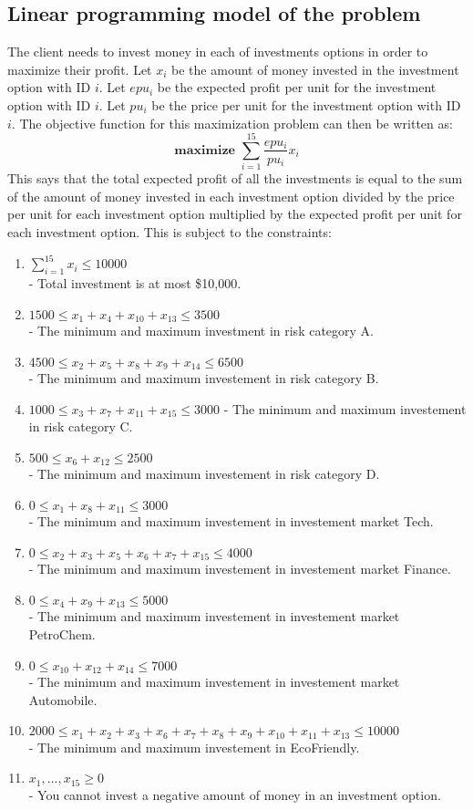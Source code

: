 \documentclass[12pt]{article}
\begin{document}
\subsection*{Linear programming model of the problem}
The client needs to invest money in each of investments options in order to maximize their profit.  Let $x_{i}$ be the amount of money invested in the investment option with ID $i$.  Let $epu_{i}$ be the expected profit per unit for the investment option with ID $i$.  Let $pu_{i}$ be the price per unit for the investment option with ID $i$.  The objective function for this maximization problem can then be written as:
$$
  \textbf{maximize } \sum_{i = 1}^{15} \frac{epu_{i}}{pu_{i}}x_{i}
$$
This says that the total expected profit of all the investments is equal to the sum of the amount of money invested in each investment option divided by the price per unit for each investment option multiplied by the expected profit per unit for each investment option.  This is subject to the constraints:
\begin{enumerate}
\itemsep0em
  \item $\sum_{i = 1}^{15} x_{i} \leq 10000$\\
  - Total investment is at most \$10,000.
  \item $1500 \leq x_{1} + x_{4} + x_{10} + x_{13} \leq 3500$\\
  - The minimum and maximum investment in risk category A.
  \item $4500 \leq x_{2} + x_{5} + x_{8} + x_{9} + x_{14} \leq 6500$\\
  - The minimum and maximum investement in risk category B.
  \item $1000 \leq x_{3} + x_{7} + x_{11} + x_{15} \leq 3000$
  - The minimum and maximum investement in risk category C.
  \item $500 \leq x_{6} + x_{12} \leq 2500$\\
  - The minimum and maximum investement in risk category D.
  \item $0 \leq x_{1} + x_{8} + x_{11} \leq 3000$\\
  - The minimum and maximum investement in investement market Tech.
  \item $0 \leq x_{2} + x_{3} + x_{5} + x_{6} + x_{7} + x_{15} \leq 4000$\\
  - The minimum and maximum investement in investement market Finance.
  \item $0 \leq x_{4} + x_{9} + x_{13} \leq 5000$\\
  - The minimum and maximum investement in investement market PetroChem.
  \item $0 \leq x_{10} + x_{12} + x_{14} \leq 7000$\\
  - The minimum and maximum investement in investement market Automobile.
  \item $2000 \leq x_{1} + x_{2} + x_{3} + x_{6} + x_{7} + x_{8} + x_{9} + x_{10} + x_{11} + x_{13} \leq 10000$\\
  - The minimum and maximum investement in EcoFriendly.
  \item $x_{1},...,x_{15} \geq 0$\\
  - You cannot invest a negative amount of money in an investment option.
\end{enumerate}
\end{document}
